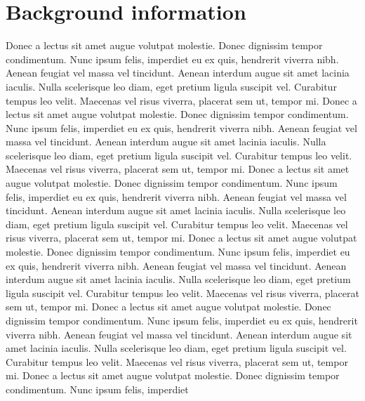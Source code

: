 \documentclass{article}
\begin{document}
\section{Background information}
Donec a lectus sit amet augue volutpat molestie. Donec dignissim tempor condimentum. Nunc ipsum felis, imperdiet
eu ex quis, hendrerit viverra nibh. Aenean feugiat vel massa vel tincidunt. Aenean interdum augue sit amet lacinia
iaculis. Nulla scelerisque leo diam, eget pretium ligula suscipit vel. Curabitur tempus leo velit. Maecenas vel
risus viverra, placerat sem ut, tempor mi.
\vspace{5mm}
\newline
Donec a lectus sit amet augue volutpat molestie. Donec dignissim tempor condimentum. Nunc ipsum felis, imperdiet
eu ex quis, hendrerit viverra nibh. Aenean feugiat vel massa vel tincidunt. Aenean interdum augue sit amet lacinia
iaculis. Nulla scelerisque leo diam, eget pretium ligula suscipit vel. Curabitur tempus leo velit. Maecenas vel
risus viverra, placerat sem ut, tempor mi.
\vspace{5mm}
\newline
Donec a lectus sit amet augue volutpat molestie. Donec dignissim tempor condimentum. Nunc ipsum felis, imperdiet
eu ex quis, hendrerit viverra nibh. Aenean feugiat vel massa vel tincidunt. Aenean interdum augue sit amet lacinia
iaculis. Nulla scelerisque leo diam, eget pretium ligula suscipit vel. Curabitur tempus leo velit. Maecenas vel
risus viverra, placerat sem ut, tempor mi.
Donec a lectus sit amet augue volutpat molestie. Donec dignissim tempor condimentum. Nunc ipsum felis, imperdiet
eu ex quis, hendrerit viverra nibh. Aenean feugiat vel massa vel tincidunt. Aenean interdum augue sit amet lacinia
iaculis. Nulla scelerisque leo diam, eget pretium ligula suscipit vel. Curabitur tempus leo velit. Maecenas vel
risus viverra, placerat sem ut, tempor mi.
\vspace{5mm}
\newline
Donec a lectus sit amet augue volutpat molestie. Donec dignissim tempor condimentum. Nunc ipsum felis, imperdiet
eu ex quis, hendrerit viverra nibh. Aenean feugiat vel massa vel tincidunt. Aenean interdum augue sit amet lacinia
iaculis. Nulla scelerisque leo diam, eget pretium ligula suscipit vel. Curabitur tempus leo velit. Maecenas vel
risus viverra, placerat sem ut, tempor mi.
\vspace{5mm}
\newline
Donec a lectus sit amet augue volutpat molestie. Donec dignissim tempor condimentum. Nunc ipsum felis, imperdiet
\end{document}
